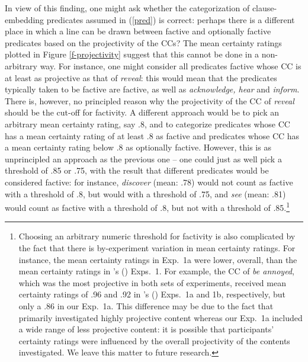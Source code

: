 \documentclass[11pt,fleqn]{article}
\newcommand{\6}{\mbox{$[\hspace*{-.6mm}[$}}
\newcommand{\9}{\mbox{$]\hspace*{-.6mm}]$}}
\newcommand{\citetpos}[1]{\citeauthor{#1}'s (\citeyear{#1})}
\begin{document}
In view of this finding, one might ask whether the categorization of clause-embedding predicates assumed in (\ref{pred}) is correct: perhaps there is a different place in which a line can be drawn between factive and optionally factive predicates based on the projectivity of the CCs? The mean certainty ratings plotted in Figure \ref{f-projectivity} suggest that this cannot be done in a non-arbitrary way. For instance, one might consider all predicates factive whose CC is at least as projective as that of {\em reveal}: this would mean that the predicates typically taken to be factive are factive, as well as {\em acknowledge, hear} and {\em inform}. There is, however, no principled reason why the projectivity of the CC of {\em reveal} should be the cut-off for factivity. A different approach would be to pick an arbitrary mean certainty rating, say .8, and to categorize predicates whose CC has a mean certainty rating of at least .8 as factive and predicates whose CC has a mean certainty rating below .8 as optionally factive. However, this is as unprincipled an approach as the previous one -- one could just as well pick a threshold of .85 or .75, with the result that different predicates would be considered factive: for instance, {\em discover} (mean: .78) would not count as factive with a threshold of .8, but would with a threshold of .75, and {\em see} (mean: .81) would count as factive with a threshold of .8, but not with a threshold of .85.\footnote{Choosing an arbitrary numeric threshold for factivity is also complicated by the fact that there is by-experiment variation in mean certainty ratings. For instance, the mean certainty ratings in Exp.~1a were lower, overall, than the mean certainty ratings in \citetpos{tbd-variability} Exps.~1. For example, the CC of {\em be annoyed}, which was the most projective in both sets of experiments, received mean certainty ratings of .96  and .92 in \citetpos{tbd-variability} Exps.~1a and 1b, respectively, but only a .86 in our Exp.~1a. This difference may be due to the fact that \citet{tbd-variability} primarily investigated highly projective content whereas our Exp.~1a included a wide range of less projective content: it is possible that participants' certainty ratings were influenced by the overall projectivity of the contents investigated. We leave this matter to future research.}
\end{document}
